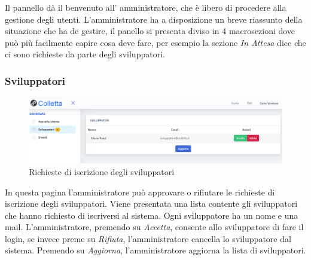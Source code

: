		 Il pannello dà il benvenuto all' amministratore, che è libero di procedere alla gestione degli utenti.
		 L'amministratore ha a disposizione un breve riassunto della situazione che ha de gestire, il panello si presenta diviso in 4 macrosezioni dove può più facilmente capire cosa deve fare, per esempio la sezione \textit{In Attesa} dice che ci sono richieste da parte degli sviluppatori.




		\subsubsection{Sviluppatori}
			\begin{figure}[H]
				\centering
				\includegraphics[width=17cm]{sez/img/amministratore/conf_ric_svil.PNG}
				\caption{Richieste di iscrizione degli sviluppatori}\label{fig:1}
			\end{figure}
		  In questa pagina l'amministratore può approvare o rifiutare le richieste di iscrizione degli sviluppatori. Viene presentata una lista contente gli sviluppatori che hanno richiesto di iscriversi al sistema. Ogni sviluppatore ha un nome e una mail. L'amministratore, premendo su \textit{Accetta}, consente allo sviluppatore di fare il login, se invece preme su \textit{Rifiuta}, l'amministratore cancella lo sviluppatore dal sistema. Premendo su \textit{Aggiorna}, l'amministratore aggiorna la lista di sviluppatori.


